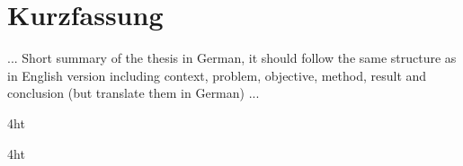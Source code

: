 \documentclass[
  a4paper,  %
  twoside,  %
  bibliography=totoc,
  headsepline,
  cleardoublepage=empty,
  parskip=half,
  draft=false
]{scrbook}
\begin{document}
\section*{Kurzfassung}
... Short summary of the thesis in German, it should follow the same structure as in English version including context, problem, objective, method, result and conclusion (but translate them in German) ...
\cleardoublepage

\iftex4ht
\else
\fi

%
%

%
%
%
\tableofcontents


\listoffigures
\listoftables

\ifdeutsch
\else
\fi


\printnoidxglossaries

\iftex4ht
\else
\fi


\mainmatter
{}

\renewcommand*{\chapterpagestyle}{scrplain}
\pagestyle{scrheadings}
\pagestyle{scrheadings}
\ihead[]{}
\chead[]{}
\ohead[]{\headmark}
\cfoot[]{}
\ifoot[]{}
\end{document}
